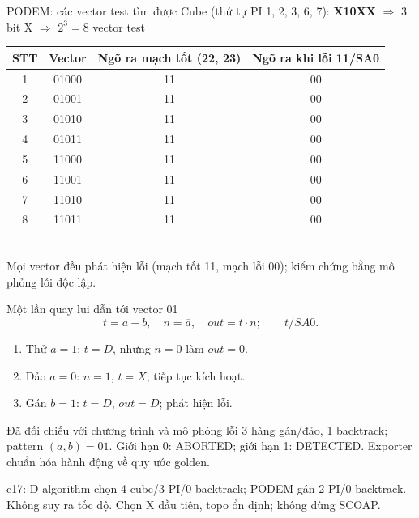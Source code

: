 \begin{frame}{PODEM: các vector test tìm được}
\centering\small
Cube (thứ tự PI 1, 2, 3, 6, 7): \textbf{X10XX} \(\Rightarrow\) 3 bit X \(\Rightarrow\) $2^3=8$ vector test\\[2mm]
\renewcommand{\arraystretch}{1.1}
\begin{tabular}{@{}cccc@{}}
\toprule
STT & Vector & Ngõ ra mạch tốt (22, 23) & Ngõ ra khi lỗi 11/SA0\\
\midrule
1 & 01000 & 11 & 00\\
2 & 01001 & 11 & 00\\
3 & 01010 & 11 & 00\\
4 & 01011 & 11 & 00\\
5 & 11000 & 11 & 00\\
6 & 11001 & 11 & 00\\
7 & 11010 & 11 & 00\\
8 & 11011 & 11 & 00\\
\bottomrule
\end{tabular}\\[2mm]
{\footnotesize Mọi vector đều phát hiện lỗi (mạch tốt 11, mạch lỗi 00); kiểm chứng bằng mô phỏng lỗi độc lập.}
\end{frame}


\begin{frame}{Một lần quay lui dẫn tới vector 01}
\[
t=a+b,\quad n=\overline a,\quad out=t\cdot n;\qquad t/SA0.
\]
\begin{enumerate}
\item Thử $a=1$: $t=D$, nhưng $n=0$ làm $out=0$.
\item Đảo $a=0$: $n=1$, $t=X$; tiếp tục kích hoạt.
\item Gán $b=1$: $t=D$, $out=D$; phát hiện lỗi.
\end{enumerate}
\begin{block}{Đã đối chiếu với chương trình và mô phỏng lỗi}
3 hàng gán/đảo, 1 backtrack; pattern $(a,b)=01$. Giới hạn 0: ABORTED;
giới hạn 1: DETECTED. Exporter chuẩn hóa hành động về quy ước golden.
\end{block}
\small c17: D-algorithm chọn 4 cube/3 PI/0 backtrack; PODEM gán 2 PI/0 backtrack.
Không suy ra tốc độ. Chọn X đầu tiên, topo ổn định; không dùng SCOAP.
\end{frame}
